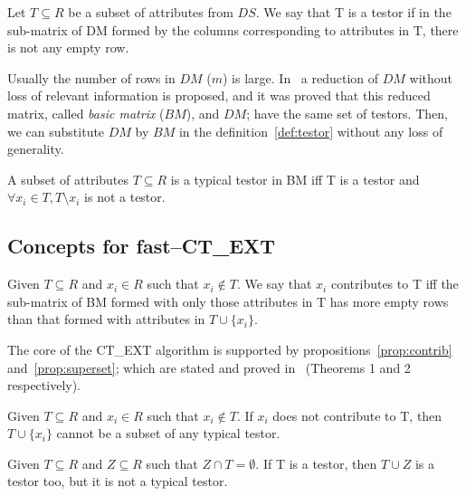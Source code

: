 \documentclass[citenumber]{llncs}
\begin{document}
	\begin{definition}\label{def:testor}
		Let $T \subseteq R$ be a subset of attributes from $DS$. We say that T is a testor if in the sub-matrix
		of DM formed by the columns corresponding to attributes in T, there is not any empty row.
	\end{definition} 	
	
	Usually the number of rows in $DM$ ($m$) is large. In~\cite{Lazo2001} a reduction of $DM$ without loss of relevant information is proposed, and it was proved that this reduced matrix, called \textit{basic matrix} ($BM$), and $DM$; have the same set of testors. Then, we can substitute $DM$ by $BM$ in the definition~\ref{def:testor} without any loss of generality. 	
	
	\begin{definition}\label{def:TT}
		A subset of attributes $T \subseteq R$ is a typical testor in BM iff T is a testor and $\forall x_i \in T, T \setminus x_i$ is not a testor. 
	\end{definition}
		
%	
\subsection{Concepts for fast--CT\_EXT}
%
		
	\begin{definition}\label{def:contrib}
		Given $T \subseteq R$ and $x_i \in R$ such that $x_i \notin T$. We say that $x_i$ contributes to T iff the sub-matrix of BM formed with only those attributes in T has more empty rows than that formed with attributes in $T \cup \lbrace x_i \rbrace$.
	\end{definition}	
	
	The core of the CT\_EXT algorithm is supported by propositions~\ref{prop:contrib} and~\ref{prop:superset}; which are stated and proved in~\cite{Sanchez2010} (Theorems 1 and 2 respectively).
	
	\begin{proposition}\label{prop:contrib} 
		Given $T \subseteq R$ and  $x_i \in R$ such that $x_i \notin T$. If $x_i$ does not contribute to T, then 		$T\cup\{x_i\}$ cannot be a subset of any typical testor.
	\end{proposition}

	\begin{proposition}\label{prop:superset} 
		Given $T \subseteq R$ and $Z \subseteq R$ such that $Z \cap T = \emptyset$. If T is a testor, then $T \cup Z$ is a 	testor too, but it is not a typical testor.
	\end{proposition}
\end{document}
